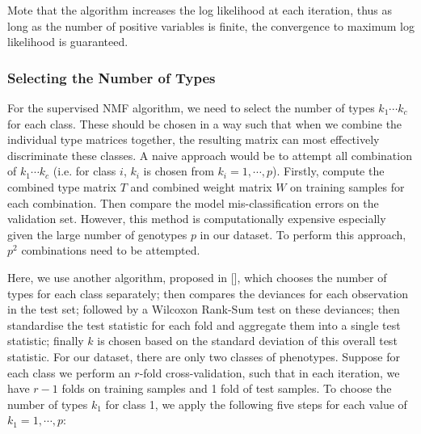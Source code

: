 \documentclass[a4paper,12pt]{article}
\begin{document}
Mote that the algorithm increases the log likelihood at each iteration, thus as long as the number of positive variables is finite, the convergence to maximum log likelihood is guaranteed. 

\subsubsection{Selecting the Number of Types}  \label{Choose The Number of Types}
For the supervised NMF algorithm, we need to select the number of types $k_{1} \cdots k_{c}$ for each class. These should be chosen in a way such that when we combine the individual type matrices together, the resulting matrix can most effectively discriminate these classes. A naive approach would be to attempt all combination of $k_{1} \cdots k_{c}$ (i.e. for class $i$, $k_{i}$ is chosen from $k_{i} = 1, \cdots, p$). Firstly, compute the combined type matrix $T$ and combined weight matrix $W$ on training samples for each combination. Then compare the model mis-classification errors on the validation set. However, this method is computationally expensive especially given the large number of genotypes $p$ in our dataset. To perform this approach, $p^{2}$ combinations need to be attempted.

Here, we use another algorithm, proposed in [\cite{cai2017learning}], which chooses the number of types for each class separately; then compares the deviances for each observation in the test set; followed by a Wilcoxon Rank-Sum test on these deviances; then standardise the test statistic for each fold and aggregate them into a single test statistic;  finally $k$ is chosen based on the standard deviation of this overall test statistic. For our dataset, there are only two classes of phenotypes. Suppose for each class we perform an $r$-fold cross-validation,  such that in each iteration, we have $r-1$ folds on training samples and 1 fold of test samples. To choose the number of types $k_{1}$ for class 1, we apply the following five steps for each value of $k_{1} = 1, \cdots, p$:
\end{document}
